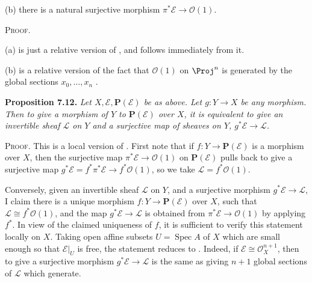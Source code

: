 {{\hypertarget{result-II-7.11b}{}(b) there is a natural surjective morphism $\pi^*\mathcal E\to\mathcal O(1)$.\par}

\smallskip
\noindent\textsc{Proof.}\par
(a) is just a relative version of , and follows immediately from it.

(b) is a relative version of the fact that $\mathcal O(1)$ on $\Proj^n$ is generated by the global sections $x_0,\ldots,x_n$ .

\medskip
\noindent\hypertarget{result-II-7.12}{}\textbf{Proposition 7.12.} \emph{Let $X,\mathcal E,\mathbf P(\mathcal E)$ be as above. Let $g\colon Y\to X$ be any morphism. Then to give a morphism of $Y$ to $\mathbf P(\mathcal E)$ over $X$, it is equivalent to give an invertible sheaf $\mathcal L$ on $Y$ and a surjective map of sheaves on $Y$, $g^*\mathcal E\to\mathcal L$.}

\smallskip
\noindent\textsc{Proof.} This is a local version of . First note that if $f\colon Y\to\mathbf P(\mathcal E)$ is a morphism over $X$, then the surjective map $\pi^*\mathcal E\to\mathcal O(1)$ on $\mathbf P(\mathcal E)$ pulls back to give a surjective map $g^*\mathcal E=f^*\pi^*\mathcal E\to f^*\mathcal O(1)$, so we take $\mathcal L=f^*\mathcal O(1)$.

Conversely, given an invertible sheaf $\mathcal L$ on $Y$, and a surjective morphism $g^*\mathcal E\to\mathcal L$, I claim there is a unique morphism $f\colon Y\to\mathbf P(\mathcal E)$ over $X$, such that $\mathcal L\cong f^*\mathcal O(1)$, and the map $g^*\mathcal E\to\mathcal L$ is obtained from $\pi^*\mathcal E\to\mathcal O(1)$ by applying $f^*$. In view of the claimed uniqueness of $f$, it is sufficient to verify this statement locally on $X$. Taking open affine subsets $U=\operatorname{Spec}A$ of $X$ which are small enough so that $\mathcal E|_U$ is free, the statement reduces to . Indeed, if $\mathcal E\cong\mathcal O_X^{n+1}$, then to give a surjective morphism $g^*\mathcal E\to\mathcal L$ is the same as giving $n+1$ global sections of $\mathcal L$ which generate.
}
